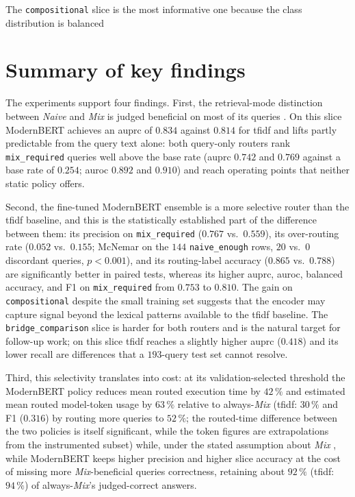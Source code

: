 \documentclass[english, bibtex]{kththesis}               %
\numberwithin{listing}{chapter}
\providecommand{\DIFaddtex}[1]{{\protect\color{blue} \sf #1}} %
\providecommand{\DIFdeltex}[1]{{\protect\color{red} \scriptsize #1}} %
\providecommand{\DIFaddbegin}{} %
\providecommand{\DIFaddend}{} %
\providecommand{\DIFdelbegin}{} %
\providecommand{\DIFdelend}{} %
\providecommand{\DIFadd}[1]{\texorpdfstring{\DIFaddtex{#1}}{#1}} %
\providecommand{\DIFdel}[1]{\texorpdfstring{\DIFdeltex{#1}}{}} %
\begin{document}
\DIFdelbegin \DIFdel{The \texttt{compositional} slice is the most informative one because the class distribution is balanced }\DIFdelend \DIFaddbegin \section{Summary of key findings}
\label{sec:discKeyFindings}

\DIFadd{The experiments support four findings. First, the retrieval-mode distinction between \emph{Naive} }\DIFaddend and \emph{Mix} is \DIFdelbegin \DIFdel{judged beneficial on most of its queries . On this slice ModernBERT achieves an \gls{auprc} of $0.834$ against $0.814$ for \gls{tfidf} and lifts }\DIFdelend \DIFaddbegin \DIFadd{partly predictable from the query text alone: both query-only routers rank \texttt{mix\_required} queries well above the base rate (\gls{auprc} $0.742$ and $0.769$ against a base rate of $0.254$; \gls{auroc} $0.892$ and $0.910$) and reach operating points that neither static policy offers.
}

\DIFadd{Second, the fine-tuned ModernBERT ensemble is a more selective router than the \gls{tfidf} baseline, and this is the statistically established part of the difference between them: its precision on \texttt{mix\_required} ($0.767$ vs.\ $0.559$), its over-routing rate ($0.052$ vs.\ $0.155$; McNemar on the $144$ \texttt{naive\_enough} rows, $20$ vs.\ $0$ discordant queries, $p < 0.001$), and its routing-label accuracy ($0.865$ vs.\ $0.788$) are significantly better in paired tests, whereas its higher \gls{auprc}, \gls{auroc}, balanced accuracy, and }\DIFaddend F1 \DIFdelbegin \DIFdel{on \texttt{mix\_required} from $0.753$ to $0.810$.
The gain on \texttt{compositional} despite the small training set suggests that the encoder may capture signal beyond the lexical patterns available to the \gls{tfidf} baseline. The \texttt{bridge\_comparison} slice is harder for both routers and is the natural target for follow-up work; on this slice \gls{tfidf} reaches a slightly higher \gls{auprc} ($0.418$)}\DIFdelend \DIFaddbegin \DIFadd{and its lower recall are differences that a $193$-query test set cannot resolve.
}

\DIFadd{Third, this selectivity translates into cost: at its validation-selected threshold the ModernBERT policy reduces mean routed execution time by $42\,\%$ and estimated mean routed model-token usage by $63\,\%$ relative to always-\emph{Mix} (\gls{tfidf}: $30\,\%$ }\DIFaddend and \DIFdelbegin \DIFdel{F1 ($0.316$) by routing more queries to }\DIFdelend \DIFaddbegin \DIFadd{$52\,\%$; the routed-time difference between the two policies is itself significant, while the token figures are extrapolations from the instrumented subset) while, under the stated assumption about }\DIFaddend \emph{Mix} \DIFdelbegin \DIFdel{, while ModernBERT keeps higher precision and higher slice accuracy at the cost of missing more \emph{Mix}-beneficial queries}\DIFdelend \DIFaddbegin \DIFadd{correctness, retaining about $92\,\%$ (\gls{tfidf}: $94\,\%$) of always-\emph{Mix}'s judged-correct answers}\DIFaddend .
\end{document}
